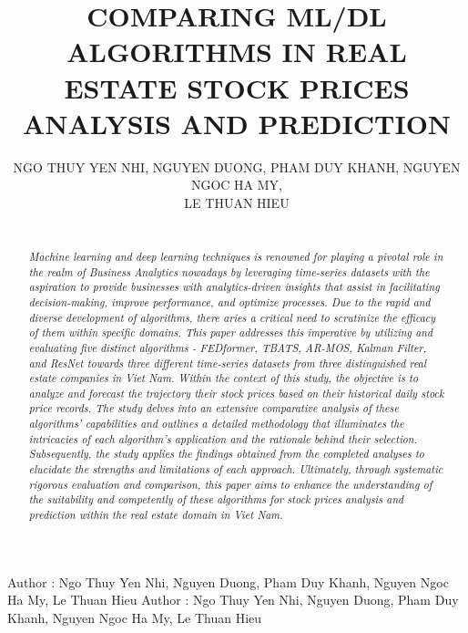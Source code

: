 \documentclass{ieeeojies}
\begin{document}
\title{COMPARING ML/DL ALGORITHMS IN REAL ESTATE STOCK PRICES ANALYSIS AND PREDICTION}

\author{\uppercase{NGO THUY YEN NHI},
\uppercase{NGUYEN DUONG, PHAM DUY KHANH},
\uppercase{NGUYEN NGOC HA MY, \\ LE THUAN HIEU}}

\address[1]{Faculty of Information Systems, University of Information Technology, (e-mail: 21521230@gm.uit.edu.vn)}
\address[2]{Faculty of Information Systems, University of Information Technology, (e-mail: 21521990@gm.uit.edu.vn)}
\address[3]{Faculty of Information Systems, University of Information Technology, (e-mail: 21522211@gm.uit.edu.vn)}
\address[4]{Faculty of Information Systems, University of Information Technology, (e-mail: 21522351@gm.uit.edu.vn)}
\address[5]{Faculty of Information Systems, University of Information Technology, (e-mail: 21522072@gm.uit.edu.vn)}

\markboth
{Author \headeretal: Ngo Thuy Yen Nhi, Nguyen Duong, Pham Duy Khanh, Nguyen Ngoc Ha My, Le Thuan Hieu}
{Author \headeretal: Ngo Thuy Yen Nhi, Nguyen Duong, Pham Duy Khanh, Nguyen Ngoc Ha My, Le Thuan Hieu}

\begin{abstract}
\\
\textit{Machine learning and deep learning techniques is renowned for playing a pivotal role in the realm of Business Analytics nowadays by leveraging time-series datasets with the aspiration to provide businesses with analytics-driven insights that assist in facilitating decision-making, improve performance, and optimize processes. Due to the rapid and diverse development of algorithms, there aries a critical need to scrutinize the efficacy of them within specific domains. This paper addresses this imperative by utilizing and evaluating five distinct algorithms - FEDformer, TBATS, AR-MOS, Kalman Filter, and ResNet towards three different time-series datasets from three distinguished real estate companies in Viet Nam. Within the context of this study, the objective is to analyze and forecast the trajectory their stock prices based on their historical daily stock price records. The study delves into an extensive comparative analysis of these algorithms' capabilities and outlines a detailed methodology that illuminates the intricacies of each algorithm's application and the rationale behind their selection. Subsequently, the study applies the findings obtained from the completed analyses to elucidate the strengths and limitations of each approach. Ultimately, through systematic rigorous evaluation and comparison, this paper aims to enhance the understanding of the suitability and competently of these algorithms for stock prices analysis and prediction within the real estate domain in Viet Nam.}
\end{abstract}
\end{document}
